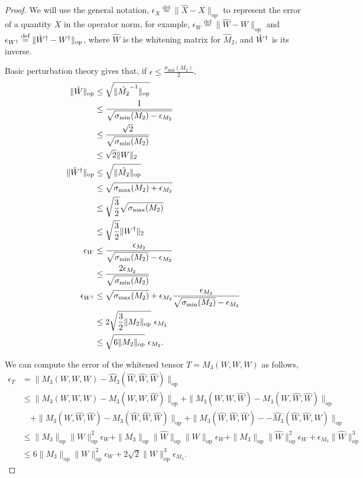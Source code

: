 \documentclass[tablecaption=bottom]{jmlr}
\newcommand\eqdef{\ensuremath{\stackrel{\textrm{def}}{=}}} %
\newcommand\sigmamin{\sigma_\textrm{min}}
\newcommand\sigmamax{\sigma_\textrm{max}}
\newcommand\op{{\textrm{op}}}
\newcommand{\Lop}{\textrm{op}}
\begin{document}
\begin{proof}
  We will use the general notation, $\epsilon_{X} \eqdef \|\hat X - X\|_\Lop$ to represent the error of a quantity $X$ in the operator norm, for example, $\epsilon_W \eqdef \|\hat W - W\|_\Lop$ and
$\epsilon_{\Winv} \eqdef \|\Whinv - \Winv\|_\Lop$,
where $\hat W$ is the whitening
matrix for $\hat M_2$, and ${\hat W}^{\dagger}$ is its inverse. 

Basic perturbation theory gives that, if $\epsilon \le \frac{\sigmamin(M_2)}{2}$,
\begin{align*}
  \|\hat W\|_\op &\le \sqrt{\|\inv{\hat {M_2}}\|_\op} \\
  &\le \frac{1}{\sqrt{\sigmamin({M_2}) - \epsilon_{M_2}} } \\
  &\le \frac{\sqrt{2}}{\sqrt{\sigmamin({M_2})}} \\
  &\le \sqrt{2} \|W\|_2 \\
  \|\Whinv\|_\op &\le \sqrt{\|\hat {M_2}\|_\op} \\
  &\le \sqrt{\sigmamax({M_2}) + \epsilon_{M_2}} \\
  &\le \sqrt{\frac{3}{2}}\sqrt{\sigmamax({M_2})} \\
  &\le \sqrt{\frac{3}{2}} \|\Winv\|_2 \\
  \epsilon_W &\le \frac{\epsilon_{M_2}}{\sqrt{\sigmamin(M_2)} - \epsilon_{M_2}} \\
             &\le \frac{2\epsilon_{M_2}}{\sqrt{\sigmamin(M_2)}} \\
  \epsilon_{\Winv} &\le {\sqrt{\sigmamax(M_2)} + \epsilon_{M_2}} \frac{\epsilon_{M_2}}{\sqrt{\sigmamin(M_2)} - \epsilon_{M_2}} \\
  &\le 2 \sqrt{\frac{3}{2} \|M_2\|_\op}~ \epsilon_{M_2} \\
  &\le \sqrt{6 \|M_2\|_\op }~ \epsilon_{M_2}.
\end{align*}

We can compute the error of the whitened tensor $T = M_3(W,W,W)$ as follows,
\begin{align*}
\epsilon_T &= \|M_3(W,W,W) - \hat M_3(\hat W,\hat W, \hat W)\|_\op \\
           &\le 
           \| {M_3}(W,W,W) - {M_3}(W,W,\hat W) \|_\op
           + \| {M_3}(W,W,\hat W) - {M_3}(W, \hat W, \hat W)\|_\op \\
           &\quad 
           + \|{M_3}(W,\hat W,\hat W) - {M_3}(\hat W, \hat W, \hat W)\|_\op 
           + \|{M_3}(\hat W,\hat W,\hat W) - - \hat {M_3}(\hat W,\hat W, \hat W)\|_\op \\
           &\le
            \| {M_3} \|_\op \|W\|^2_\op \epsilon_W +
            \| {M_3} \|_\op \|\hat W\|_\op \|W\|_\op \epsilon_W +
            \| {M_3} \|_\op \|\hat W\|^2_\op \epsilon_W +
            \epsilon_{M_3} \|\hat W\|^3_\op  \\
           &\le
           6 \| {M_3} \|_\op \|W\|^2_\op \epsilon_W + 2\sqrt{2} \|W\|^3_\op \epsilon_{M_3}.
\end{align*}


\end{proof}
\end{document}
